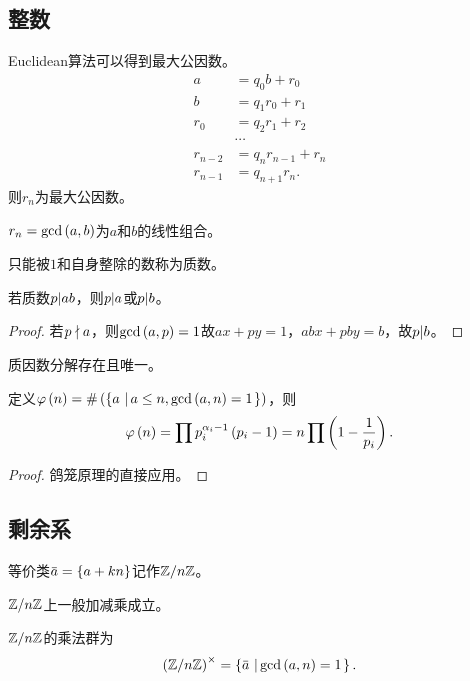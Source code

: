 \documentclass{ctexrep}
\begin{document}
\subsection{整数}
\begin{theorem}
Euclidean算法可以得到最大公因数。
\begin{align*}
a &= q_0 b + r_0 \\
b &= q_1 r_0 + r_1\\
r_0 &= q_2 r_1 + r_2\\
&\cdots \\
r_{n-2} &= q_n r_{n-1}+r_n\\
r_{n-1} &= q_{n+1} r_n.
\end{align*}
则$r_n$为最大公因数。
\end{theorem}
\begin{corollary}
$r_n=\gcd\left(a,b\right)$为$a$和$b$的线性组合。
\end{corollary}
\begin{definition}
只能被$1$和自身整除的数称为质数。
\end{definition}
\begin{theorem}
若质数$p| ab$，则$p| a$或$p| b$。
\end{theorem}
\begin{proof}
若$p\nmid a$，则$\gcd\left(a,p\right) = 1$故$ax+py=1$，$abx+pby=b$，故$p| b$。
\end{proof}
\begin{theorem}[算术基本定理]
质因数分解存在且唯一。
\end{theorem}
\begin{theorem}
定义$\varphi\left(n\right)=\#\left(\left\{a \, \left| \, a\le n, \gcd \left(a,n\right)=1 \right.\right\}\right)$，则
\[ \varphi\left(n\right)=\prod p_i^{\alpha_i-1}\left(p_{i}-1\right) = n \prod \left(1-\frac{1}{p_i}\right). \]
\end{theorem}
\begin{proof}
鸽笼原理的直接应用。
\end{proof}
\subsection{剩余系}
\begin{definition}
等价类$\modeq{a}=\curb{a+kn}$记作$\mathbb{Z}/n\mathbb{Z}$。
\end{definition}
\begin{theorem}
$\mathbb{Z}/n\mathbb{Z}$上一般加减乘成立。
\end{theorem}
\begin{theorem}
$\mathbb{Z}/n\mathbb{Z}$的乘法群为
\[ \prodg{\Z/n\Z}=\setcond{\modeq{a}}{\gcd\pare{a,n}=1}. \]
\end{theorem}
\end{document}

